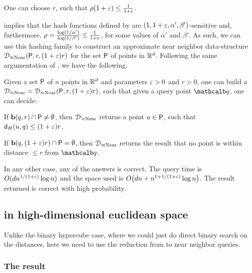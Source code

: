 \begin{lemma}
    One can choose $r$, such that $\rho(1+{\varepsilon}) \leq
    \frac{1}{1+{\varepsilon}}$. 
\end{lemma}

 implies that the hash functions defined by
 are $(1,1+{\varepsilon},\alpha', \beta')$-sensitive and,
furthermore, $\rho = \frac{\log (1/\alpha')}{\log (1/\beta')} \leq
\frac{1}{1+{\varepsilon}}$, for some values of $\alpha'$ and $\beta'$. As such,
we can use this hashing family to construct an approximate near
neighbor data-structure $\DSAprxNearNbr(\PntSet,r,(1+\eps)r)$ for the
set ${\mathsf{P}}$ of points in $\mathbb{R}^d$. Following the same
argumentation of , we have the
following.

\begin{theorem}
    Given a set ${\mathsf{P}}$ of $n$ points in $\mathbb{R}^d$ and parameters
    ${\varepsilon}>0$ and $r > 0$, one can build a $\DSAprxNearNbr =
    \DSAprxNearNbr(\PntSet,r,(1+\eps)r)$, such that given a query
    point $\query$, one can decide:
    \begin{compactenumA}
        \item If $\mathbf{b}(q, r) \cap {\mathsf{P}} \ne \emptyset$, then
        $\DSAprxNearNbr$ returns a point $u \in {\mathsf{P}}$, such that
        $\distH{u}{q} \leq (1+\eps)r$.

        \item If $\mathbf{b}(q, (1+{\varepsilon})r) \cap {\mathsf{P}} = \emptyset$, then
        $\DSAprxNearNbr$ returns the result that no point is within
        distance $\leq r$ from $\query$.
    \end{compactenumA}
    In any other case, any of the answers is correct. The query time
    is $O( d n^{1/(1+{\varepsilon})} \log n)$ and the space used is
    $O\pth{\hdim n + n^{1 + 1/(1+\eps)} \log n }$. The result returned
    is correct with high probability.
\end{theorem}

\subsection{\ANNbr in high-dimensional euclidean space}

Unlike the binary hypercube case, where we could just do direct binary
search on the distances, here we need to use the reduction from \ANNbr
to near neighbor queries.

\subsubsection{The result}

